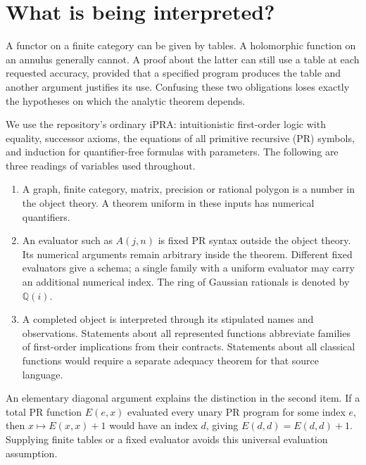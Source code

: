 \section{What is being interpreted?}\label{sec:meaning}
A functor on a finite category can be given by tables. A holomorphic function on an annulus generally cannot. A proof about the latter can still use a table at each requested accuracy, provided that a specified program produces the table and another argument justifies its use. Confusing these two obligations loses exactly the hypotheses on which the analytic theorem depends.

We use the repository's ordinary iPRA: intuitionistic first-order logic with equality, successor axioms, the equations of all primitive recursive (PR) symbols, and induction for quantifier-free formulas with parameters. The following are three readings of variables used throughout.
\begin{enumerate}
\item A graph, finite category, matrix, precision or rational polygon is a number in the object theory. A theorem uniform in these inputs has numerical quantifiers.
\item An evaluator such as $A(j,n)$ is fixed PR syntax outside the object theory. Its numerical arguments remain arbitrary inside the theorem. Different fixed evaluators give a schema; a single family with a uniform evaluator may carry an additional numerical index. The ring of Gaussian rationals is denoted by $\mathbb Q(i)$.
\item A completed object is interpreted through its stipulated names and observations. Statements about all represented functions abbreviate families of first-order implications from their contracts. Statements about all classical functions would require a separate adequacy theorem for that source language.
\end{enumerate}
An elementary diagonal argument explains the distinction in the second item. If a total PR function $E(e,x)$ evaluated every unary PR program for some index $e$, then $x\mapsto E(x,x)+1$ would have an index $d$, giving $E(d,d)=E(d,d)+1$. Supplying finite tables or a fixed evaluator avoids this universal evaluation assumption.

